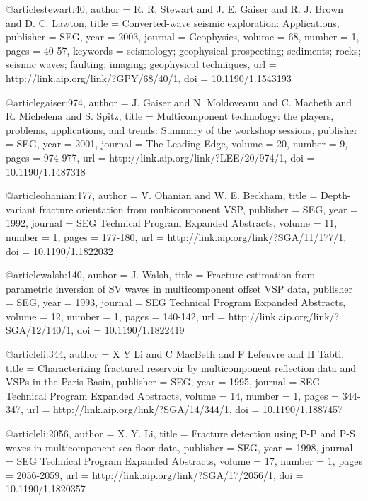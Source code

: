 @article{stewart:40,
  author =	 {R. R. Stewart and J. E. Gaiser and R. J.
                  Brown and D. C. Lawton},
  title =	 {Converted-wave seismic exploration: Applications},
  publisher =	 {SEG},
  year =	 2003,
  journal =	 {Geophysics},
  volume =	 68,
  number =	 1,
  pages =	 {40-57},
  keywords =	 {seismology; geophysical prospecting; sediments;
                  rocks; seismic waves; faulting; imaging; geophysical
                  techniques},
  url =		 {http://link.aip.org/link/?GPY/68/40/1},
  doi =		 {10.1190/1.1543193}
}

@article{gaiser:974,
  author =	 {J. Gaiser and N. Moldoveanu and C. Macbeth
                  and R. Michelena and S. Spitz},
  title =	 {Multicomponent technology: the players, problems,
                  applications, and trends: Summary of the workshop
                  sessions},
  publisher =	 {SEG},
  year =	 2001,
  journal =	 {The Leading Edge},
  volume =	 20,
  number =	 9,
  pages =	 {974-977},
  url =		 {http://link.aip.org/link/?LEE/20/974/1},
  doi =		 {10.1190/1.1487318}
}

@article{ohanian:177,
  author =	 {V. Ohanian and W. E. Beckham},
  title =	 {Depth-variant fracture orientation from
                  multicomponent VSP},
  publisher =	 {SEG},
  year =	 1992,
  journal =	 {SEG Technical Program Expanded Abstracts},
  volume =	 11,
  number =	 1,
  pages =	 {177-180},
  url =		 {http://link.aip.org/link/?SGA/11/177/1},
  doi =		 {10.1190/1.1822032}
}

@article{walsh:140,
  author =	 {J. Walsh},
  title =	 {Fracture estimation from parametric inversion of
                  {SV} waves in multicomponent offset VSP data},
  publisher =	 {SEG},
  year =	 1993,
  journal =	 {SEG Technical Program Expanded Abstracts},
  volume =	 12,
  number =	 1,
  pages =	 {140-142},
  url =		 {http://link.aip.org/link/?SGA/12/140/1},
  doi =		 {10.1190/1.1822419}
}

@article{li:344,
  author =	 {X Y Li and C MacBeth and F
                  Lefeuvre and H Tabti},
  title =	 {Characterizing fractured reservoir by multicomponent
                  reflection data and {VSP}s in the Paris Basin},
  publisher =	 {SEG},
  year =	 1995,
  journal =	 {SEG Technical Program Expanded Abstracts},
  volume =	 14,
  number =	 1,
  pages =	 {344-347},
  url =		 {http://link.aip.org/link/?SGA/14/344/1},
  doi =		 {10.1190/1.1887457}
}

@article{li:2056,
  author =	 {X. Y. Li},
  title =	 {Fracture detection using {P}-{P} and {P}-{S} waves
                  in multicomponent sea-floor data},
  publisher =	 {SEG},
  year =	 1998,
  journal =	 {SEG Technical Program Expanded Abstracts},
  volume =	 17,
  number =	 1,
  pages =	 {2056-2059},
  url =		 {http://link.aip.org/link/?SGA/17/2056/1},
  doi =		 {10.1190/1.1820357}
}

